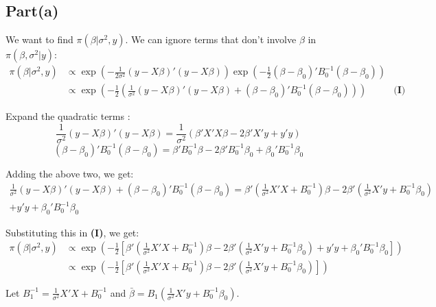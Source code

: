 \documentclass[a4paper]{article}
\begin{document}
\subsection*{Part(a)}

We want to find $\pi(\beta | \sigma^2, y)$. We can ignore terms that don't involve $\beta$ in \(\pi(\beta,\sigma^2|y)\):
    \begin{align*}
        \pi(\beta | \sigma^2, y) &\propto \exp\left(-\frac{1}{2\sigma^2}(y - X\beta)'(y - X\beta)\right) \exp\left(-\frac{1}{2}(\beta - \beta_0)' B_0^{-1} (\beta - \beta_0)\right)\\
        &\propto \exp\left(-\frac{1}{2}\left(\frac{1}{\sigma^2}(y - X\beta)'(y - X\beta)+(\beta - \beta_0)' B_0^{-1} (\beta - \beta_0)\right)\right) & \textbf{(I)}
    \end{align*}
    
    Expand the quadratic terms :
    $$\frac{1}{\sigma^2}(y - X\beta)'(y - X\beta) = \frac{1}{\sigma^2}\left(\beta' X' X \beta - 2\beta' X' y + y'y\right) $$
    $$(\beta - \beta_0)' B_0^{-1} (\beta - \beta_0) = \beta' B_0^{-1} \beta - 2\beta' B_0^{-1} \beta_0 + \beta_0' B_0^{-1} \beta_0$$

    Adding the above two, we get:
    \begin{align*}
        \frac{1}{\sigma^2}(y - X\beta)'(y - X\beta)+(\beta - \beta_0)' B_0^{-1} (\beta - \beta_0) =  \beta' \left(\frac{1}{\sigma^2} X' X + B_0^{-1}\right) \beta - 2\beta'\left(\frac{1}{\sigma^2} X' y + B_0^{-1} \beta_0\right) \\
    + y'y + \beta_0'B_0^{-1}\beta_0
    \end{align*}


    Substituting this in \textbf{(I)}, we get:
    \begin{align*}
        \pi(\beta | \sigma^2, y) &\propto \exp\left(-\frac{1}{2} \left[ \beta' \left(\frac{1}{\sigma^2} X' X + B_0^{-1}\right) \beta - 2\beta'\left(\frac{1}{\sigma^2} X' y + B_0^{-1} \beta_0\right) + y'y + \beta_0'B_0^{-1}\beta_0 \right]\right)\\
        & \propto \exp\left(-\frac{1}{2} \left[ \beta' \left(\frac{1}{\sigma^2} X' X + B_0^{-1}\right) \beta - 2\beta' \left(\frac{1}{\sigma^2} X' y + B_0^{-1} \beta_0\right) \right] \right)
    \end{align*}

    Let $B_1^{-1} = \frac{1}{\sigma^2} X' X + B_0^{-1}$ and $\bar{\beta} = B_1 \left(\frac{1}{\sigma^2} X' y + B_0^{-1} \beta_0\right)$. 
    
\end{document}
